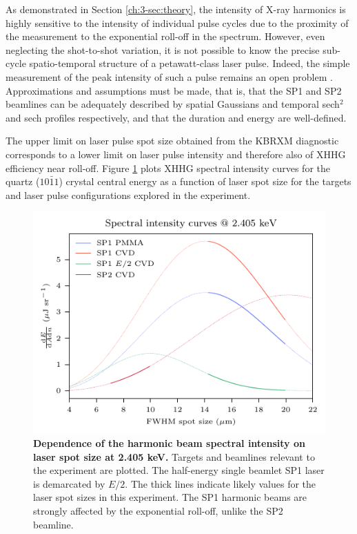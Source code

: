 As demonstrated in Section \ref{ch:3-sec:theory}, the intensity of X-ray harmonics is highly sensitive to the intensity of individual pulse cycles due to the proximity of the measurement to the exponential roll-off in the spectrum. However, even neglecting the shot-to-shot variation, it is not possible to know the precise sub-cycle spatio-temporal structure of a petawatt-class laser pulse. Indeed, the simple measurement of the peak intensity of such a pulse remains an open problem \cite{perevalovLaserPeelerRegime2023,ouatuIonizationStatesMultipetawatt2022}. Approximations and assumptions must be made, that is, that the SP1 and SP2 beamlines can be adequately described by spatial Gaussians and temporal sech$^2$ and sech profiles respectively, and that the duration and energy are well-defined. 

The upper limit on laser pulse spot size obtained from the KBRXM diagnostic corresponds to a lower limit on laser pulse intensity and therefore also of XHHG efficiency near roll-off. Figure \ref{fig:orionintensitycurves} plots XHHG spectral intensity curves for the quartz ($10\bar{1}1$) crystal central energy as a function of laser spot size for the targets and laser pulse configurations explored in the experiment. 
\begin{figure}
	\centering
	\includegraphics{figures/orion/orion_intensity_curves}
	\caption[Dependence of the harmonic beam spectral intensity on laser spot size at 2.405 keV.]{\textbf{Dependence of the harmonic beam spectral intensity on laser spot size at 2.405 keV.} Targets and beamlines relevant to the experiment are plotted. The half-energy single beamlet SP1 laser is demarcated by $E/2$. The thick lines indicate likely values for the laser spot sizes in this experiment. The SP1 harmonic beams are strongly affected by the exponential roll-off, unlike the SP2 beamline.}
	\label{fig:orionintensitycurves}
\end{figure}
